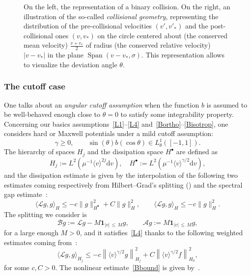 \documentclass[AHL,Unicode,longabstracts,published]{cedram}
\DeclareMathOperator{\Span}{Span}
\renewcommand{\d}{\mathrm{d}}
\newcommand{\Burin}{\mathbf{1}}
\renewcommand{\AA}{\mathcal{A}}
\newcommand{\BB}{\mathcal{B}}
\newcommand{\LL}{\mathcal{L}}
\newcommand{\Ss}{H}
\newcommand{\Ssp}{H^{\bullet}}
\renewcommand*\le{\leqslant}
\renewcommand*\ge{\geqslant}
\newcommand{\la}{\langle}
\newcommand{\ra}{\rangle}
\begin{document}
\begin{figure}[h]
\caption{On the left, the representation of a binary collision. On the right, an illustration of the so-called \emph{collisional geometry}, representing the distribution of the pre-collisional velocities $(v', v'_*)$ and the post-collisional ones $(v, v_*)$ on the circle centered about (the conserved mean velocity) $\frac{v + v_*}{2}$ of radius (the conserved relative velocity) $|v-v_*|$ in the plane $\Span(v-v_*, \sigma)$. This representation allows to visualize the deviation angle $\theta$.}
\end{figure}

\subsubsection{The cutoff case}

One talks about an \emph{angular cutoff assumption} when the function $b$ is assumed to be well-behaved enough close to $\theta = 0$ to satisfy some integrability property. Concerning our basics assumptions~\eqref{L1}--\eqref{L4} and~\eqref{Bortho}--\eqref{Bisotrop}, one considers hard or Maxwell potentials under a mild cutoff assumption:
\[
\gamma \ge 0, \qquad \sin(\theta) b(\cos \theta) \in L^1_\theta\left([-1, 1] \right).
\]
The hierarchy of spaces $\Ss_j$ and the dissipation space $\Ssp$ are defined as
\[
\Ss_j := L^2\left(\mu^{-1} \la v \ra^{2j} \d v \right), \quad \Ssp := L^2\left(\mu^{-1} \la v \ra^{\gamma/2} \d v\right),
\]
and the dissipation estimate is given by the interpolation of the following two estimates coming respectively from Hilbert--Grad's splitting (\cite{G1963,H1912}) and the spectral gap estimate~\cite[Theorem~1.1]{BM2005}:
\[
\la \LL g, g \ra_\Ss \le - c \| g \|^2_{\Ssp} + C \| g \|_{\Ss}^2, \qquad \la \LL g, g \ra_\Ss \le - c \| g \|^2_{\Ss}.
\]
The splitting we consider is
\[
\BB g := \LL g- M \Burin_{| v |\,\le\,M} g, \qquad \AA g := M \Burin_{| v |\,\le\,M} g,
\]
for a large enough $M > 0$, and it satisfies~\ref{L4} thanks to the following weighted estimates coming from~\cite[Proof of Lemma~3.3 for $\beta = 0$]{G2006}:
\[
\la \LL g, g \ra_{\Ss_j} \le - c \left\| \la v \ra^{\gamma/2} g \right\|^2_{\Ss_j} + C \left\| \la v \ra^{\gamma / 2} f \right\|_{\Ss_0}^2,
\]
for some $c, C > 0$. The nonlinear estimate~\ref{Bbound} is given by~\cite[Lemma~4.1]{G2004}.
\end{document}
